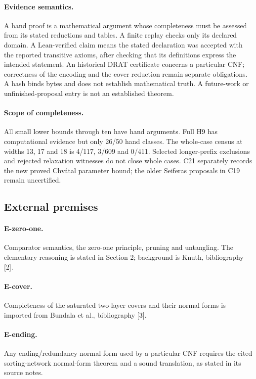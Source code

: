 \documentclass[11pt]{article}
\begin{document}
\paragraph{Evidence semantics.}
A hand proof is a mathematical argument whose completeness must be assessed from its stated reductions and tables. A finite replay checks only its declared domain. A Lean-verified claim means the stated declaration was accepted with the reported transitive axioms, after checking that its definitions express the intended statement. An historical DRAT certificate concerns a particular CNF; correctness of the encoding and the cover reduction remain separate obligations. A hash binds bytes and does not establish mathematical truth. A future-work or unfinished-proposal entry is not an established theorem.

\paragraph{Scope of completeness.}
All small lower bounds through ten have hand arguments. Full H9 has computational evidence but only 26/50 hand classes. The whole-case census at widths 13, 17 and 18 is 4/117, 3/609 and 0/411. Selected longer-prefix exclusions and rejected relaxation witnesses do not close whole cases. C21 separately records the new proved Chv\'atal parameter bound; the older Seiferas proposals in C19 remain uncertified.

\subsection{External premises}
\paragraph{E-zero-one.} Comparator semantics, the zero-one principle, pruning and untangling. The elementary reasoning is stated in Section 2; background is Knuth, bibliography [2].
\paragraph{E-cover.} Completeness of the saturated two-layer covers and their normal forms is imported from Bundala et al., bibliography [3].
\paragraph{E-ending.} Any ending/redundancy normal form used by a particular CNF requires the cited sorting-network normal-form theorem and a sound translation, as stated in its source notes.
\end{document}
